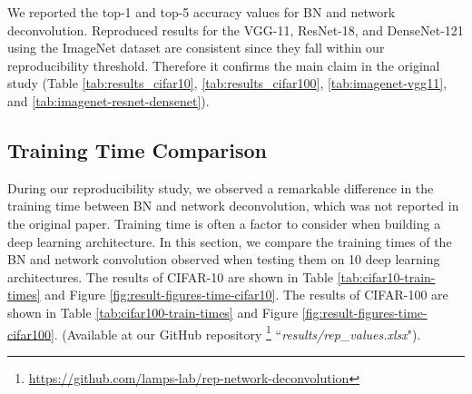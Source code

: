 We reported the top-1 and top-5 accuracy values for BN and network deconvolution. Reproduced results for the VGG-11, ResNet-18, and DenseNet-121 using the ImageNet dataset are consistent since they fall within our reproducibility threshold. Therefore it confirms the main claim in the original study (Table \ref{tab:results_cifar10}, \ref{tab:results_cifar100}, \ref{tab:imagenet-vgg11}, and \ref{tab:imagenet-resnet-densenet}). 





\subsection{Training Time Comparison}
During our reproducibility study, we observed a remarkable difference in the training time between  BN and network deconvolution, which was not reported in the original paper. Training time is often a factor to consider when building a deep learning architecture. In this section, we compare the training times of the BN and network convolution observed when testing them on 10 deep learning architectures. 
The results of CIFAR-10 are shown in Table \ref{tab:cifar10-train-times}  and Figure \ref{fig:result-figures-time-cifar10}. The results of CIFAR-100 are shown in Table \ref{tab:cifar100-train-times} and Figure \ref{fig:result-figures-time-cifar100}.  (Available at our GitHub repository \footnote{\url{https://github.com/lamps-lab/rep-network-deconvolution}} ``\textit{results/rep\_values.xlsx}").\\

